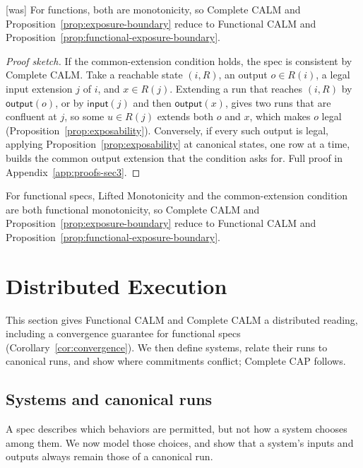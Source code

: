 \documentclass[sigconf]{cidr-2027}
\theoremstyle{remark}
\newcommand{\commitments}{commitments\xspace}
\newcommand{\indesc}{input extension\xspace} %
\newcommand{\outrel}{extends\xspace}          %
\newcommand{\outnoun}{output extension\xspace}%
\begin{document}
{\footnotesize\color{black!50}\noindent\textsf{[was]} For functions, both are monotonicity, so Complete CALM and
Proposition~\ref{prop:exposure-boundary} reduce to Functional CALM and
Proposition~\ref{prop:functional-exposure-boundary}.\par}

\color{blue!70!black}\begin{proof}[Proof sketch]
If the common-extension condition holds, the spec is consistent by Complete
CALM.  Take a reachable state $(i,R)$, an output $o\in R(i)$, a legal \indesc
$j$ of $i$, and $x\in R(j)$.  Extending a run that reaches $(i,R)$ by
$\mathsf{output}(o)$, or by $\mathsf{input}(j)$ and then $\mathsf{output}(x)$,
gives two runs that are confluent at $j$, so some $u\in R(j)$ \outrel both $o$
and $x$, which makes $o$ legal (Proposition~\ref{prop:exposability}).
Conversely, if every such output is legal, applying
Proposition~\ref{prop:exposability} at canonical states, one row at a time,
builds the common \outnoun that the condition asks for.  Full proof in
Appendix~\ref{app:proofs-sec3}.\color{black}
\end{proof}

\color{blue!70!black}For functional specs, Lifted Monotonicity and the common-extension condition
are both functional monotonicity, so Complete CALM and
Proposition~\ref{prop:exposure-boundary} reduce to Functional CALM and
Proposition~\ref{prop:functional-exposure-boundary}.\color{black}

\section{Distributed Execution}
\label{sec:distributed-execution}

This section gives Functional CALM and Complete CALM a distributed reading,
including a convergence guarantee for functional specs
(Corollary~\ref{cor:convergence}).  We then define systems, relate their runs to
canonical runs, and show where \commitments conflict; Complete CAP follows.



\subsection{Systems and canonical runs}
\label{sec:systems}

A spec describes which behaviors are permitted, but not how a system chooses
among them.  We now model those choices, and show that a system's inputs and
outputs always remain those of a canonical run.
\end{document}
